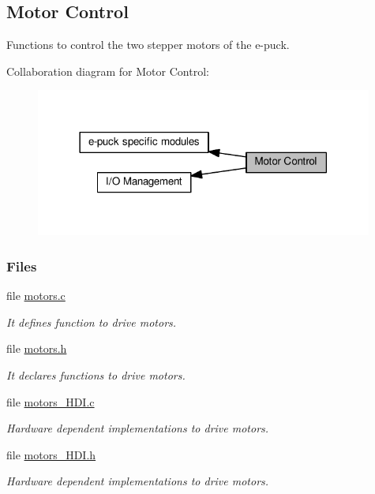 \hypertarget{group__motors}{}\subsection{Motor Control}
\label{group__motors}


Functions to control the two stepper motors of the e-\/puck.  


Collaboration diagram for Motor Control\+:\nopagebreak
\begin{figure}[H]
\begin{center}
\leavevmode
\includegraphics[width=314pt]{dd/daa/group__motors}
\end{center}
\end{figure}
\subsubsection*{Files}
\begin{DoxyCompactItemize}
\item 
file \hyperlink{motors_8c}{motors.\+c}
\begin{DoxyCompactList}\small\item\em It defines function to drive motors. \end{DoxyCompactList}\item 
file \hyperlink{motors_8h}{motors.\+h}
\begin{DoxyCompactList}\small\item\em It declares functions to drive motors. \end{DoxyCompactList}\item 
file \hyperlink{motors__HDI_8c}{motors\+\_\+\+H\+D\+I.\+c}
\begin{DoxyCompactList}\small\item\em Hardware dependent implementations to drive motors. \end{DoxyCompactList}\item 
file \hyperlink{motors__HDI_8h}{motors\+\_\+\+H\+D\+I.\+h}
\begin{DoxyCompactList}\small\item\em Hardware dependent implementations to drive motors. \end{DoxyCompactList}\end{DoxyCompactItemize}


